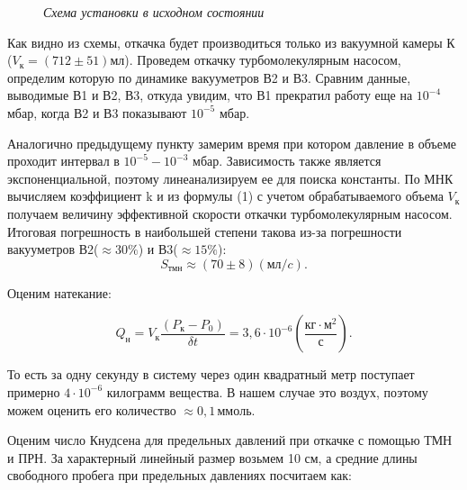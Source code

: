\documentclass[a4paper, fontsize = 14pt]{article}
\begin{document}
\begin{figure}[hbt]\label{risIII}
\caption{\textit{Схема установки в исходном состоянии}}
\end{figure}

Как видно из схемы, откачка будет производиться только из вакуумной камеры К ($V_{к} = (712\pm51)мл$). Проведем откачку турбомолекулярным насосом, определим которую по динамике вакууметров В2 и В3. Сравним данные, выводимые В1 и В2, В3, откуда увидим, что В1 прекратил работу еще на $10^{-4}$ мбар, когда В2 и В3 показывают $10^{-5}$ мбар.

Аналогично предыдущему пункту замерим время при котором давление в объеме проходит интервал в $10^{-5}-10^{-3}$ мбар. Зависимость также является экспоненциальной, поэтому линеанализируем ее для поиска константы. По МНК вычисляем коэффициент k и из формулы (1) с учетом обрабатываемого объема $V_{к}$ получаем величину эффективной скорости откачки турбомолекулярным насосом. Итоговая погрешность в наибольшей степени такова из-за погрешности вакууметров В2($\approx 30\%$) и В3($\approx 15\%$):
\[ S_{тмн} \approx (70\pm8)(мл/c). \]

Оценим натекание:

\[ Q_{н} = V_к \frac{(P_к-P_0)}{\delta t} = 3,6\cdot10^{-6} (\frac{кг\cdot м^2}{с}). \]

То есть за одну секунду в систему через один квадратный метр поступает примерно $4\cdot10^{-6}$ килограмм вещества. В нашем случае это воздух, поэтому можем оценить его количество $\approx 0,1 \, ммоль$. 

Оценим число Кнудсена для предельных давлений при откачке с помощью ТМН и ПРН. За характерный линейный размер возьмем 10 см, а средние длины свободного пробега при предельных давлениях посчитаем как:
\end{document}
